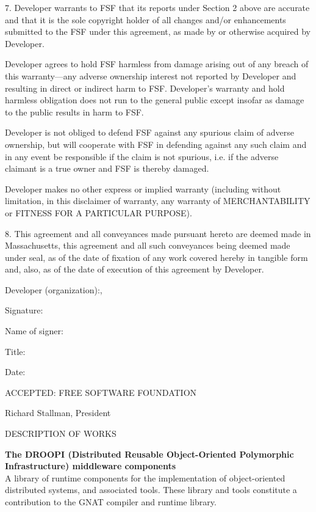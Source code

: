 \documentclass[a4paper,12pt]{article}
\begin{document}
 7. Developer warrants to FSF that its reports under Section 2 above
 are accurate and that it is the sole copyright holder of all changes
 and/or enhancements submitted to the FSF under this agreement, as made
 by or otherwise acquired by Developer.
 
 Developer agrees to hold FSF harmless from damage arising out of any
 breach of this warranty---any adverse ownership interest not reported
 by Developer and resulting in direct or indirect harm to FSF.
 Developer's warranty and hold harmless obligation does not run to the
 general public except insofar as damage to the public results in harm
 to FSF.
 
 Developer is not obliged to defend FSF against any spurious claim of
 adverse ownership, but will cooperate with FSF in defending against
 any such claim and in any event be responsible if the claim is not
 spurious, i.e. if the adverse claimant is a true owner and FSF is
 thereby damaged.
 
 Developer makes no other express or implied warranty (including
 without limitation, in this disclaimer of warranty, any warranty of
 MERCHANTABILITY or FITNESS FOR A PARTICULAR PURPOSE).
 
 8. This agreement and all conveyances made pursuant hereto are deemed
 made in Massachusetts, this agreement and all such conveyances being
 deemed made under seal, as of the date of fixation of any work covered
 hereby in tangible form and, also, as of the date of execution of this
 agreement by Developer.
 
          Developer (organization):\hrulefill,
 
         
 	 Signature:\hrulefill
 
 
          Name of signer:\hrulefill
 
 
          Title:\hrulefill
 
 
          Date:\hrulefill
 
 
 ACCEPTED: FREE SOFTWARE FOUNDATION
 
 Richard Stallman, President

\newpage
\centering DESCRIPTION OF WORKS
 
\vspace{2cm}

\begin{center}
\large 
{\bfseries The DROOPI (Distributed Reusable Object-Oriented
Polymorphic Infrastructure) middleware components}\\
A library of runtime components for the implementation
of object-oriented distributed systems, and associated
tools. These library and tools constitute a contribution
to the GNAT compiler and runtime library.
\end{center}
\end{document}
